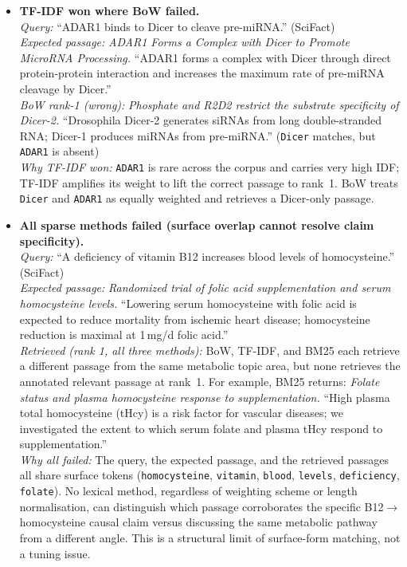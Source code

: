 \documentclass[12pt, a4paper]{article}
\newcommand{\scifact}{SciFact}
\begin{document}
\begin{itemize}
\item \textbf{TF-IDF won where BoW failed.}\\
  \textit{Query:} ``ADAR1 binds to Dicer to cleave pre-miRNA.'' (\scifact{})\\
  \textit{Expected passage:} \textit{ADAR1 Forms a Complex with Dicer to Promote MicroRNA
    Processing.} ``ADAR1 forms a complex with Dicer through direct protein-protein
    interaction and increases the maximum rate of pre-miRNA cleavage by Dicer.''\\
  \textit{BoW rank-1 (wrong):} \textit{Phosphate and R2D2 restrict the substrate specificity
    of Dicer-2.} ``Drosophila Dicer-2 generates siRNAs from long double-stranded RNA; Dicer-1
    produces miRNAs from pre-miRNA.'' (\texttt{Dicer} matches, but \texttt{ADAR1} is absent)\\
  \textit{Why TF-IDF won:} \texttt{ADAR1} is rare across the corpus and carries very high
    IDF; TF-IDF amplifies its weight to lift the correct passage to rank~1.  BoW treats
    \texttt{Dicer} and \texttt{ADAR1} as equally weighted and retrieves a Dicer-only passage.

\item \textbf{All sparse methods failed (surface overlap cannot resolve claim specificity).}\\
  \textit{Query:} ``A deficiency of vitamin B12 increases blood levels of homocysteine.'' (\scifact{})\\
  \textit{Expected passage:} \textit{Randomized trial of folic acid supplementation and serum
    homocysteine levels.} ``Lowering serum homocysteine with folic acid is expected to reduce
    mortality from ischemic heart disease; homocysteine reduction is maximal at 1\,mg/d folic
    acid.''\\
  \textit{Retrieved (rank 1, all three methods):} BoW, TF-IDF, and BM25 each retrieve a
    different passage from the same metabolic topic area, but none retrieves the annotated
    relevant passage at rank~1.  For example, BM25 returns: \textit{Folate status and plasma
    homocysteine response to supplementation.} ``High plasma total homocysteine (tHcy) is a
    risk factor for vascular diseases; we investigated the extent to which serum folate and
    plasma tHcy respond to supplementation.''\\
  \textit{Why all failed:} The query, the expected passage, and the retrieved passages all
    share surface tokens (\texttt{homocysteine}, \texttt{vitamin}, \texttt{blood},
    \texttt{levels}, \texttt{deficiency}, \texttt{folate}).  No lexical method, regardless
    of weighting scheme or length normalisation, can distinguish which passage
    corroborates the specific B12$\to$homocysteine causal claim versus discussing the same
    metabolic pathway from a different angle.  This is a structural limit of surface-form
    matching, not a tuning issue.

\end{itemize}
\end{document}
